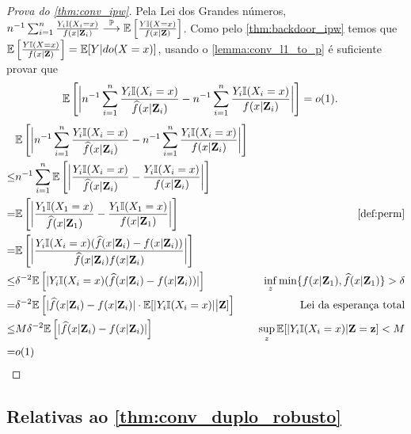\begin{proof}[Prova do \cref{thm:conv_ipw}]
 Pela Lei dos Grandes números,
 $n^{-1} \sum_{i=1}^n \frac{Y_i {\mathbb I}(X_i = x)}{f(x|{\mathbf{Z}}_i)} 
 \stackrel{{\mathbb P}}{\longrightarrow} {\mathbb E}\left[\frac{Y {\mathbb I}(X = x)}{f(x|{\mathbf{Z}})}\right]$. Como
 pelo \cref{thm:backdoor_ipw} temos que
 ${\mathbb E}\left[\frac{Y {\mathbb I}(X = x)}{f(x|{\mathbf{Z}})}\right] = {\mathbb E}[Y|do(X=x)]$,
 usando o \cref{lemma:conv_l1_to_p} é suficiente provar que 
 \begin{align*}
 {\mathbb E}\left[\bigg|n^{-1} \sum_{i=1}^n \frac{Y_i {\mathbb I}(X_i = x)}{\widehat{f}(x|{\mathbf{Z}}_i)} 
  - n^{-1} \sum_{i=1}^n \frac{Y_i {\mathbb I}(X_i = x)}{f(x|{\mathbf{Z}}_i)}\bigg|\right]
  &= o(1).
 \end{align*}
 \begin{align*}
  &\E\left[\bigg|n^{-1} \sum_{i=1}^n \frac{Y_i \I(X_i = x)}{\hf(x|\Z_i)} 
  - n^{-1} \sum_{i=1}^n \frac{Y_i \I(X_i = x)}{f(x|\Z_i)}\bigg|\right] \\
  \leq& n^{-1}\sum_{i=1}^n
  \E\left[\bigg|\frac{Y_i \I(X_i = x)}{\hf(x|\Z_i)} 
  -\frac{Y_i \I(X_i = x)}{f(x|\Z_i)}\bigg|\right] \\
  =& \E\left[\bigg|\frac{Y_1 \I(X_1 = x)}{\hf(x|\Z_1)} 
  -\frac{Y_1 \I(X_1 = x)}{f(x|\Z_1)}\bigg|\right]
  & \text{\cref{def:perm}} \\
  =& \E\left[\bigg|\frac{Y_i \I(X_i = x)(\hf(x|\Z_i)-f(x|\Z_i))}
  {\hf(x|\Z_i)f(x|\Z_i)}\bigg|\right] \\
  \leq& \delta^{-2}\E\left[|Y_i \I(X_i = x)(\hf(x|\Z_i)-f(x|\Z_i))|\right] 
  & \inf_z \min\{f(x|\Z_1), \hf(x|\Z_1)\} > \delta \\
  =& \delta^{-2}\E\left[|
  \hf(x|\Z_i)-f(x|\Z_i)|\cdot \E[|Y_i \I(X_i = x)|\big|\Z]\right] 
  & \text{Lei da esperança total} \\
  \leq& M\delta^{-2} \E\left[|\hf(x|\Z_i)-f(x|\Z_i)|\right]
  & \sup_z \E[|Y_i \I(X_i = x)|\Z=\z] < M \\
  =& o(1)
 \end{align*}
\end{proof}

\subsection{Relativas ao \cref{thm:conv_duplo_robusto}}

